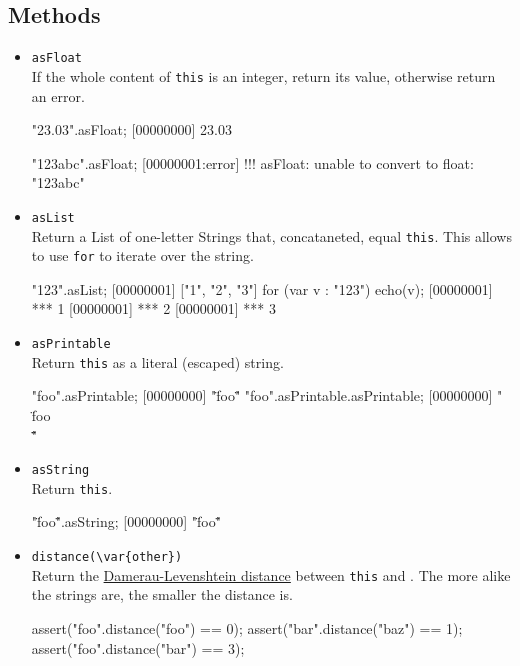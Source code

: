 \subsection{Methods}
\begin{itemize}
\item \lstinline|asFloat|\\
  If the whole content of \lstinline|this| is an integer, return its
  value, otherwise return an error.
\begin{urbiscript}[firstnumber=last]
"23.03".asFloat;
[00000000] 23.03

"123abc".asFloat;
[00000001:error] !!! asFloat: unable to convert to float: "123abc"
\end{urbiscript}

\item \lstinline|asList|\\
  Return a List of one-letter Strings that, concataneted, equal
  \lstinline|this|.  This allows to use \lstinline|for| to iterate
  over the string.
\begin{urbiscript}[firstnumber=last]
"123".asList;
[00000001] ["1", "2", "3"]
for (var v : "123")
  echo(v);
[00000001] *** 1
[00000001] *** 2
[00000001] *** 3
\end{urbiscript}

\item \lstinline|asPrintable|\\
  Return \lstinline|this| as a literal (escaped) string.
\begin{urbiscript}[firstnumber=last]
"foo".asPrintable;
[00000000] "\"foo\""
"foo".asPrintable.asPrintable;
[00000000] "\"\\\"foo\\\"\""
\end{urbiscript}

\item \lstinline|asString|\\
  Return \lstinline|this|.
\begin{urbiscript}[firstnumber=last]
"\"foo\"".asString;
[00000000] "\"foo\""
\end{urbiscript}

\item \lstinline|distance(\var{other})|\\
  Return the
  \href{http://en.wikipedia.org/wiki/Damerau-Levenshtein_distance}
  {Damerau-Levenshtein distance} between \lstinline|this| and
  .  The more alike the strings are, the smaller the
  distance is.
\begin{urbiscript}[firstnumber=last]
assert("foo".distance("foo") == 0);
assert("bar".distance("baz") == 1);
assert("foo".distance("bar") == 3);
\end{urbiscript}


\end{itemize}

